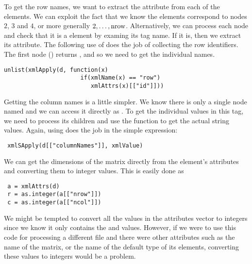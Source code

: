 To get the row names, we want to extract the 
attribute from each of the  elements.  We can exploit the
fact that we know the  elements correspond to nodes $2$,
$3$ and $4$, or more generally $2, \ldots, \hbox{nrow}$.
Alternatively, we can process each node and check that it is
a  element by examing its tag name.
If it is, then we extract its  attribute.
The following use of  does the job of collecting
the row identifiers. The first node () returns
\SNull, and so we need  to get the individual
names.
\begin{verbatim}
unlist(xmlApply(d, function(x) 
                      if(xmlName(x) == "row") 
                         xmlAttrs(x)[["id"]]))
\end{verbatim}
Getting the column names is a little simpler.  We know there is only a
single node named  and we can access it directly
as .  To get the individual values in
this tag, we need to process its children and use the
 function to get the actual string values.
Again, using  does the job in the simple expression:
\begin{verbatim}
 xmlSApply(d[["columnNames"]], xmlValue)
\end{verbatim}

We can get the dimensions of the matrix directly from the  element's
attributes and converting them to integer values.  This is easily done
as
\begin{verbatim}
 a = xmlAttrs(d)
 r = as.integer(a[["nrow"]])
 c = as.integer(a[["ncol"]])
\end{verbatim}
We might be tempted to convert all the values in the attributes vector
to integers since we know it only contains the  and
 values.  However, if we were to use this code for
processing a different file and there were other attributes such as
the name of the matrix, or the name of the default type of its
elements, converting these values to integers would be a problem.

